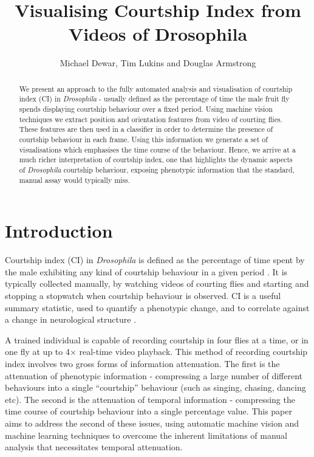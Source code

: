\documentclass[twocolumn]{article}
\title{Visualising Courtship Index from Videos of Drosophila}
\author{Michael Dewar, Tim Lukins and Douglas Armstrong}
\begin{document}
	
	\maketitle

	\begin{abstract}
	{\sf
	We present an approach to the fully automated analysis and visualisation of courtship index (CI) in \emph{Drosophila} - usually defined as the percentage of time the male fruit fly spends displaying courtship behaviour over a fixed period. Using machine vision techniques we extract position and orientation features from video of courting flies. These features are then used in a classifier in order to determine the presence of courtship behaviour in each frame. Using this information we generate a set of visualisations which emphasises the time course of the behaviour. Hence, we arrive at a much richer interpretation of courtship index, one that highlights the dynamic aspects of \emph{Drosophila} courtship behaviour, exposing phenotypic information that the standard, manual assay would typically miss.
	}
	\end{abstract}

\section{Introduction}

Courtship index (CI) in \emph{Drosophila} is defined as the percentage of time spent by the male exhibiting any kind of courtship behaviour in a given period \cite{}. It is typically collected manually, by watching videos of courting flies and starting and stopping a stopwatch when courtship behaviour is observed. CI is a useful summary statistic, used to quantify a phenotypic change, and to correlate against a change in neurological structure \cite{}.

A trained individual is capable of recording courtship in four flies at a time, or in one fly at up to 4$\times$ real-time video playback. This method of recording courtship index involves two gross forms of information attenuation. The first is the attenuation of phenotypic information - compressing a large number of different behaviours into a single ``courtship'' behaviour (such as singing, chasing, dancing etc). The second is the attenuation of temporal information - compressing the time course of courtship behaviour into a single percentage value. This paper aims to address the second of these issues, using automatic machine vision and machine learning techniques to overcome the inherent limitations of manual analysis that necessitates temporal attenuation.
\end{document}
